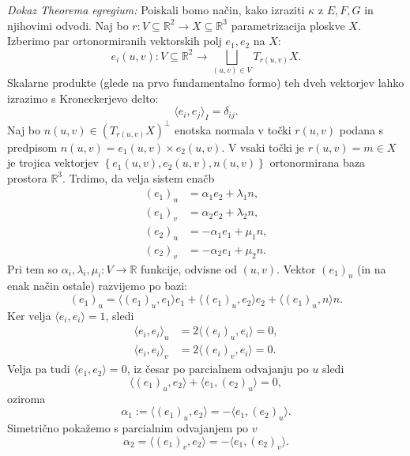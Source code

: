 \noindent
{\em Dokaz Theorema egregium:\/}
Poiskali bomo način, kako izraziti $\kappa$ z $E, F, G$ in njihovimi odvodi. Naj bo $r: V \subseteq \mathbb{R}^2 \to  X \subseteq  \mathbb{R}^3$ parametrizacija ploskve $X$. Izberimo par ortonormiranih
vektorskih polj $e_1, e_2$ na $X$: \begin{equation*}
e_i(u,v): V \subseteq \mathbb{R}^2  \to \bigsqcup_{(u,v) \in  V} T_{r(u,v)}X.
\end{equation*}  
Skalarne produkte (glede na prvo fundamentalno formo) teh dveh vektorjev lahko izrazimo s Kroneckerjevo delto: \begin{equation*}
\langle e_i, e_j \rangle_{I} = \delta_{ij}. 
\end{equation*}
Naj bo $n(u,v) \in (T_{r(u,v)}X)^{\perp}$ enotska normala v točki $r(u,v)$ podana s predpisom $n(u,v) = e_1(u,v) \times  e_2(u,v)$. V vsaki točki je $r(u,v) = m \in  X$ je trojica vektorjev $\left\{ e_1(u,v), e_2(u,v), n(u,v)\right\}$ ortonormirana baza prostora $\mathbb{R}^3$. 
Trdimo, da velja sistem enačb \begin{align*}
    (e_1)_u &= \alpha_1 e_2 + \lambda_1 n, \\
    (e_1)_v &= \alpha_2 e_2 + \lambda_2 n, \\
    (e_2)_u &= - \alpha_1 e_1 + \mu_1 n, \\
    (e_2)_v &= - \alpha_2 e_1 + \mu_2 n.
\end{align*}
Pri tem so $\alpha_i, \lambda_i, \mu_i: V \to \mathbb{R}$ funkcije, odvisne od $(u,v)$. Vektor $(e_1)_u$ (in na enak način ostale) razvijemo po bazi: \begin{equation*}
(e_1)_u = \langle (e_1)_u, e_1 \rangle e_1 + \langle  (e_1)_u, e_2 \rangle e_2 + \langle (e_1)_u, n \rangle n. 
\end{equation*}
Ker velja $\langle e_i, e_i \rangle = 1 $, sledi \begin{align*}
    \langle e_i, e_i \rangle_u  &=  2 \langle (e_i)_u, e_i \rangle  = 0, \\
    \langle e_i, e_i \rangle_v  &=  2 \langle (e_i)_v, e_i \rangle  = 0.
\end{align*}
Velja pa tudi $\langle e_1, e_2 \rangle = 0$, iz česar po parcialnem odvajanju po $u$ sledi
\begin{equation*}
    \langle (e_1)_u, e_2 \rangle + \langle e_1, (e_2)_u \rangle = 0, 
\end{equation*}  
oziroma \begin{equation*}
\alpha_1 := \langle (e_1)_u, e_2 \rangle = - \langle e_1, (e_2)_u \rangle.    
\end{equation*}  
Simetrično pokažemo s parcialnim odvajanjem po $v$ \begin{equation*}
\alpha_2  = \langle (e_1)_v, e_2 \rangle = - \langle e_1, (e_2)_v \rangle.
\end{equation*}  

